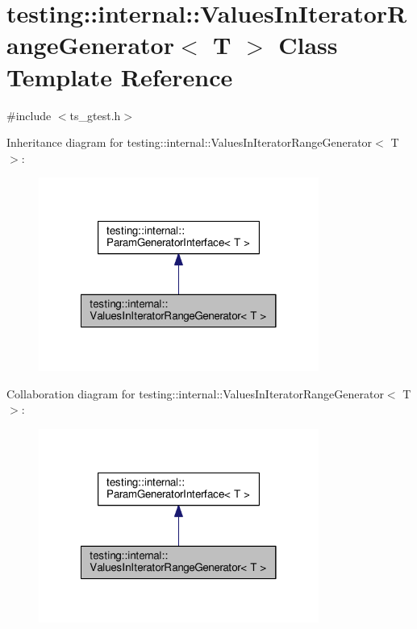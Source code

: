 \hypertarget{classtesting_1_1internal_1_1ValuesInIteratorRangeGenerator}{\section{testing\-:\-:internal\-:\-:Values\-In\-Iterator\-Range\-Generator$<$ T $>$ Class Template Reference}
\label{classtesting_1_1internal_1_1ValuesInIteratorRangeGenerator}
}


{\ttfamily \#include $<$ts\-\_\-gtest.\-h$>$}



Inheritance diagram for testing\-:\-:internal\-:\-:Values\-In\-Iterator\-Range\-Generator$<$ T $>$\-:\nopagebreak
\begin{figure}[H]
\begin{center}
\leavevmode
\includegraphics[width=260pt]{classtesting_1_1internal_1_1ValuesInIteratorRangeGenerator__inherit__graph}
\end{center}
\end{figure}


Collaboration diagram for testing\-:\-:internal\-:\-:Values\-In\-Iterator\-Range\-Generator$<$ T $>$\-:\nopagebreak
\begin{figure}[H]
\begin{center}
\leavevmode
\includegraphics[width=260pt]{classtesting_1_1internal_1_1ValuesInIteratorRangeGenerator__coll__graph}
\end{center}
\end{figure}
